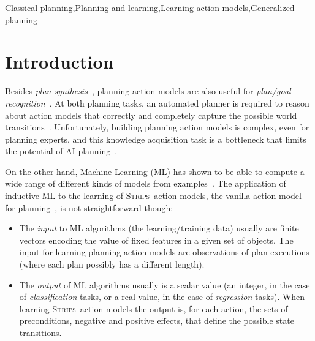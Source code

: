 \documentclass[3p,times]{elsarticle}
\newcommand{\strips}{\textsc{Strips}}     %
\begin{document}
\begin{frontmatter}
\begin{keyword}
Classical planning\sep Planning and learning\sep Learning action models\sep Generalized planning

\end{keyword}

\end{frontmatter}






\section{Introduction}
\label{sec:Section1}
Besides {\em plan synthesis}~\cite{ghallab2004automated}, planning action models are also useful for {\em plan/goal recognition}~\cite{ramirez2012plan}. At both planning tasks, an automated planner is required to reason about action models that correctly and completely capture the possible world transitions~\cite{geffner:book:2013}. Unfortunately, building planning action models is complex, even for planning experts, and this knowledge acquisition task is a bottleneck that limits the potential of AI planning~\cite{kambhampati:modellite:AAAI2007}.

On the other hand, Machine Learning (ML) has shown to be able to compute a wide range of different kinds of models from examples~\cite{michalski2013machine}. The application of inductive ML to the learning of \strips\ action models, the vanilla action model for planning~\cite{fikes1971strips}, is not straightforward though:
\begin{itemize}
\item The {\em input} to ML algorithms (the learning/training data) usually are finite vectors encoding the value of fixed features in a given set of objects. The input for learning planning action models are observations of plan executions (where each plan possibly has a different length).
\item The {\em output} of ML algorithms usually is a scalar value (an integer, in the case of {\em classification} tasks, or a real value, in the case of {\em regression} tasks). When learning \strips\ action models the output is, for each action, the sets of preconditions, negative and positive effects, that define the possible state transitions.
\end{itemize}
\end{document}
